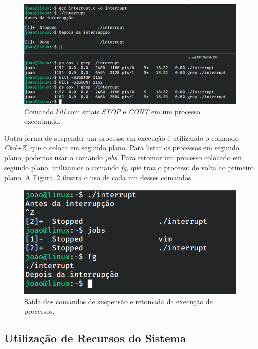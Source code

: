 \documentclass[
	12pt,				%
	oneside,   	        %
	a4paper,			%
	english,			%
	french,				%
	spanish,			%
	brazil,				%
	]{pacotes/abntex2}
\begin{document}
\begin{figure}[H]
  \centering
  \includegraphics[scale=0.45]{figuras/signal.png}
  \caption{Comando \textit{kill} com sinais \textit{STOP} e \textit{CONT} em um processo executando.}
  \label{fig:signal}
\end{figure}

Outra forma de suspender um processo em execução é utilizando o comando \textit{Ctrl+Z}, que o coloca em segundo plano. Para listar os processos em segundo plano, podemos usar o comando \textit{jobs}. Para retomar um processo colocado em segundo plano, utilizamos o comando \textit{fg}, que traz o processo de volta ao primeiro plano. A Figura~\ref{fig:background} ilustra o uso de cada um desses comandos.

\begin{figure}[H]
  \centering
  \includegraphics[scale=0.45]{figuras/background.png}
  \caption{Saída dos comandos de suspensão e retomada da execução de processos.}
  \label{fig:background}
\end{figure}

\subsection{Utilização de Recursos do Sistema}
\label{subsec:recursos}
\end{document}
